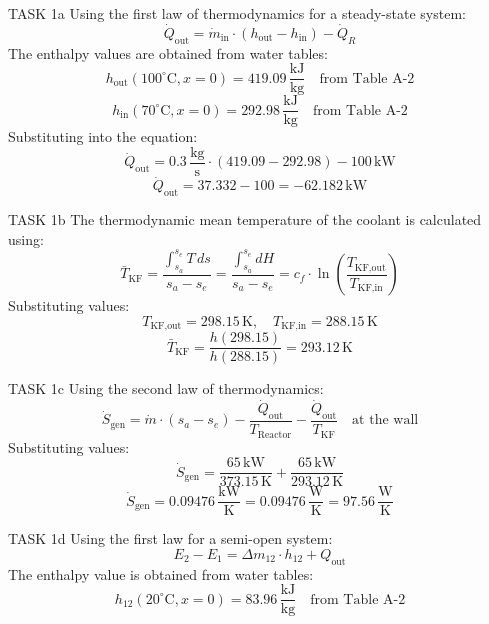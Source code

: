 TASK 1a  
Using the first law of thermodynamics for a steady-state system:  
\[
\dot{Q}_{\text{out}} = \dot{m}_{\text{in}} \cdot (h_{\text{out}} - h_{\text{in}}) - \dot{Q}_R
\]  
The enthalpy values are obtained from water tables:  
\[
h_{\text{out}}(100^\circ\text{C}, x=0) = 419.09 \, \frac{\text{kJ}}{\text{kg}} \quad \text{from Table A-2}
\]  
\[
h_{\text{in}}(70^\circ\text{C}, x=0) = 292.98 \, \frac{\text{kJ}}{\text{kg}} \quad \text{from Table A-2}
\]  
Substituting into the equation:  
\[
\dot{Q}_{\text{out}} = 0.3 \, \frac{\text{kg}}{\text{s}} \cdot (419.09 - 292.98) - 100 \, \text{kW}
\]  
\[
\dot{Q}_{\text{out}} = 37.332 - 100 = -62.182 \, \text{kW}
\]  

TASK 1b  
The thermodynamic mean temperature of the coolant is calculated using:  
\[
\bar{T}_{\text{KF}} = \frac{\int_{s_a}^{s_e} T \, ds}{s_a - s_e} = \frac{\int_{s_a}^{s_e} dH}{s_a - s_e} = c_f \cdot \ln\left(\frac{T_{\text{KF,out}}}{T_{\text{KF,in}}}\right)
\]  
Substituting values:  
\[
T_{\text{KF,out}} = 298.15 \, \text{K}, \quad T_{\text{KF,in}} = 288.15 \, \text{K}
\]  
\[
\bar{T}_{\text{KF}} = \frac{h(298.15)}{h(288.15)} = 293.12 \, \text{K}
\]  

TASK 1c  
Using the second law of thermodynamics:  
\[
\dot{S}_{\text{gen}} = \dot{m} \cdot (s_a - s_e) - \frac{\dot{Q}_{\text{out}}}{T_{\text{Reactor}}} - \frac{\dot{Q}_{\text{out}}}{T_{\text{KF}}} \quad \text{at the wall}
\]  
Substituting values:  
\[
\dot{S}_{\text{gen}} = \frac{65 \, \text{kW}}{373.15 \, \text{K}} + \frac{65 \, \text{kW}}{293.12 \, \text{K}}
\]  
\[
\dot{S}_{\text{gen}} = 0.09476 \, \frac{\text{kW}}{\text{K}} = 0.09476 \, \frac{\text{W}}{\text{K}} = 97.56 \, \frac{\text{W}}{\text{K}}
\]  

TASK 1d  
Using the first law for a semi-open system:  
\[
E_2 - E_1 = \Delta m_{12} \cdot h_{12} + Q_{\text{out}}
\]  
The enthalpy value is obtained from water tables:  
\[
h_{12}(20^\circ\text{C}, x=0) = 83.96 \, \frac{\text{kJ}}{\text{kg}} \quad \text{from Table A-2}
\]  